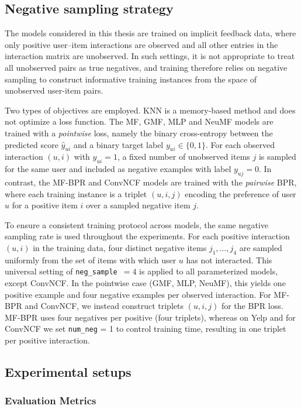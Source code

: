 \documentclass[11pt]{article}
\begin{document}
\subsection{Negative sampling strategy}

The models considered in this thesis are trained on implicit feedback data, where only positive user--item interactions are observed and all other entries in the interaction matrix are unobserved. In such settings, it is not appropriate to treat all unobserved pairs as true negatives, and training therefore relies on negative sampling to construct informative training instances from the space of unobserved user-item pairs.

Two types of objectives are employed. KNN is a memory-based method and does not optimize a loss function. The MF, GMF, MLP and NeuMF models are trained with a \emph{pointwise} loss, namely the binary cross-entropy between the predicted score $\hat{y}_{ui}$ and a binary target label $y_{ui} \in \{0,1\}$. For each observed interaction $(u,i)$ with $y_{ui}=1$, a fixed number of unobserved items $j$ is sampled for the same user and included as negative examples with label $y_{uj}=0$. In contrast, the MF-BPR and ConvNCF models are trained with the \emph{pairwise} BPR, where each training instance is a triplet $(u,i,j)$ encoding the preference of user $u$ for a positive item $i$ over a sampled negative item $j$.

To ensure a consistent training protocol across models, the same negative sampling rate is used throughout the experiments. For each positive interaction $(u,i)$ in the training data, four distinct negative items $j_1,\dots,j_4$ are sampled uniformly  from the set of items with which user $u$ has not interacted. This universal setting of \texttt{neg\_sample}~$=4$ is applied to all parameterized models, except ConvNCF. In the pointwise case (GMF, MLP, NeuMF), this yields one positive example and four negative examples per observed interaction. 
For MF-BPR and ConvNCF, we instead construct triplets $(u,i,j)$ for the BPR loss. MF-BPR uses four negatives per positive (four triplets), whereas on Yelp and for ConvNCF we set \texttt{num\_neg} = 1 to control training time, resulting in one triplet per positive interaction.



\subsection{Experimental setups}
\subsubsection{Evaluation Metrics}
\end{document}
